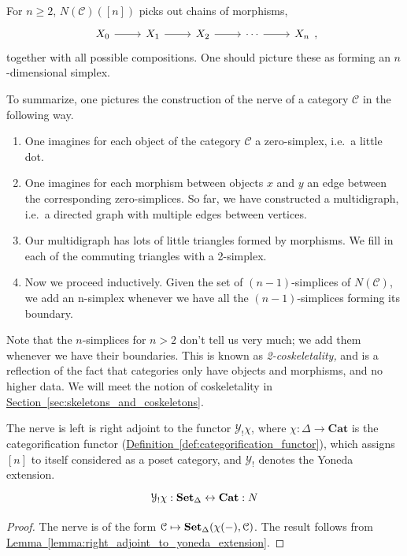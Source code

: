 \documentclass[main.tex]{subfiles}
\begin{document}
For $n \geq 2$, $N(\mathcal{C})([n])$ picks out chains of morphisms,
\begin{equation*}
  \begin{tikzcd}
    X_{0}
    \arrow[r]
    & X_{1}
    \arrow[r]
    & X_{2}
    \arrow[r]
    & \cdots
    \arrow[r]
    & X_{n}
  \end{tikzcd},
\end{equation*}
together with all possible compositions. One should picture these as forming an $n$-dimensional simplex.

To summarize, one pictures the construction of the nerve of a category $\mathcal{C}$ in the following way.
\begin{enumerate}
  \item One imagines for each object of the category $\mathcal{C}$ a zero-simplex, i.e.\ a little dot.

  \item One imagines for each morphism between objects $x$ and $y$ an edge between the corresponding zero-simplices. So far, we have constructed a multidigraph, i.e.\ a directed graph with multiple edges between vertices.

  \item Our multidigraph has lots of little triangles formed by morphisms. We fill in each of the commuting triangles with a 2-simplex.

  \item Now we proceed inductively. Given the set of $(n-1)$-simplices of $N(\mathcal{C})$, we add an n-simplex whenever we have all the $(n-1)$-simplices forming its boundary.
\end{enumerate}
Note that the $n$-simplices for $n > 2$ don't tell us very much; we add them whenever we have their boundaries. This is known as \emph{2-coskeletality,} and is a reflection of the fact that categories only have objects and morphisms, and no higher data. We will meet the notion of coskeletality in \hyperref[sec:skeletons_and_coskeletons]{Section~\ref*{sec:skeletons_and_coskeletons}}.

\begin{proposition}
  \label{prop:nerve_left_adjoint_to_yoneda_extension}
  The nerve is left is right adjoint to the functor $\mathcal{Y}_{!}\chi$, where $\chi\colon \Delta \to \mathbf{Cat}$ is the categorification functor (\hyperref[def:categorification_functor]{Definition~\ref*{def:categorification_functor}}), which assigns $[n]$ to itself considered as a poset category, and $\mathcal{Y}_{!}$ denotes the Yoneda extension.
  \begin{equation*}
    \begin{tikzcd}
      \mathcal{Y}_{!}\chi : \SSet \leftrightarrow \mathbf{Cat} : N
    \end{tikzcd}
  \end{equation*}
\end{proposition}
\begin{proof}
  The nerve is of the form $\mathcal{C} \mapsto \operatorname{\mathbf{Set}_{\Delta}}(\chi(-), \mathcal{C})$. The result follows from \hyperref[lemma:right_adjoint_to_yoneda_extension]{Lemma~\ref*{lemma:right_adjoint_to_yoneda_extension}}.
\end{proof}
\end{document}
